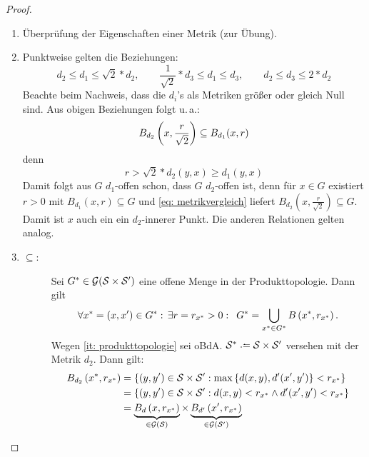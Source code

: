 \begin{proof}
	\begin{enumerate}[label=(zu \arabic*), leftmargin=*]
		\item \label{it: zu_ref_it_produktmetrik}
		Überprüfung der Eigenschaften einer Metrik (zur Übung).
%		
		\item \label{par:zu_ref_it_produkttopologie}
			Punktweise gelten die Beziehungen:
			\begin{equation*}
				d_2 \le d_1 \le\sqrt{2}* d_2,
				\qquad
				\frac{1}{\sqrt{2}} * d_3 \le d_1 \le d_3,
				\qquad
				d_2 \le d_3 \le 2 * d_2
			\end{equation*}
			Beachte beim Nachweis, dass die $d_i$'s als Metriken größer oder gleich Null sind. Aus obigen Beziehungen folgt u.\,a.:
			\begin{equation*}
				B_{d_2}\brackets{x,\frac{r}{\sqrt{2}}} \subseteq  B_{d_1}(x,r)
			\end{equation*}
			denn
			\begin{equation}
				r > \sqrt{2} * d_2(y,x) \ge d_1(y,x) \label{eq: metrikvergleich}
			\end{equation}
			Damit folgt aus $G$ $d_1$-offen schon, dass $G$ $d_2$-offen ist, denn für $x \in G$ existiert $r > 0$ mit $B_{d_1}(x, r) \subseteq G$ und \eqref{eq: metrikvergleich} liefert
			$B_{d_2}(x, \frac{r}{\sqrt{2}}) \subseteq G$. Damit ist $x$ auch ein ein $d_2$-innerer Punkt. Die anderen Relationen gelten analog.
		\item \begin{description}
				\item[$\subseteq$:] 
				\label{it: zu_ref_it_produktbasis}
				Sei $G^\ast \in \mathcal{G}(\S \times \S')$ eine offene Menge in der Produkttopologie. Dann gilt
				\begin{equation*}
					\forall x^\ast = (x,x') \in G^\ast: \, \exists r = r_{x^\ast} > 0: \enskip 
					G^\ast = \bigcup_{x^\ast \in G^\ast} B\brackets{x^\ast,r_{x^\ast}}.
				\end{equation*}
				Wegen \cref{it: produkttopologie} sei oBdA. $\S^\ast \defeq \S \times \S'$ versehen mit der Metrik $d_2$. Dann gilt:
				\begin{align*}
					B_{d_2}\brackets{x^\ast,r_{x^\ast}}
					&= \menge{(y,y')\in \S \times \S': \max \menge{d(x,y),d'(x',y')} < r_{x^\ast}} \\
					&= \menge{(y,y') \in \S \times \S': d(x,y) < r_{x^\ast} \land d'(x',y') < r_{x^\ast}} \\ 
					&=  \underbrace{B_d\brackets{x,r_{x^\ast}}}_{\in \mathcal{G}(\S)} \times \underbrace{B_{d'}\brackets{x', r_{x^\ast}}}_{\in\mathcal{G}(\S')}

\end{align*}
\end{description}
\end{enumerate}
\end{proof}
